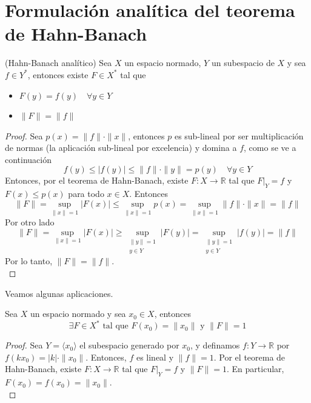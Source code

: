 \section{Formulación analítica del teorema de Hahn-Banach}

\begin{teo}(Hahn-Banach analítico)
    Sea $X$ un espacio normado, $Y$ un subespacio de $X$ y sea $f\in Y^*$, entonces existe $F \in X^*$ tal que \begin{itemize}
        \item [i)] $F(y) = f(y) \quad \forall y \in Y$
        \item [ii)] $\|F\| = \|f\|$
    \end{itemize}
\begin{proof}
    Sea $p(x) = \|f\| \cdot \|x\|$, entonces $p$ es sub-lineal por ser multiplicación de normas (la aplicación sub-lineal por excelencia) y domina a $f$, como se ve a continuación
    \begin{equation*}
        f(y) \leq |f(y)| \leq \|f\| \cdot \|y\| = p(y) \quad \forall y \in Y
    \end{equation*}
    Entonces, por el teorema de Hahn-Banach, existe $F: X \to \mathbb{R}$ tal que $F|_Y = f$ y $F(x) \leq p(x)$ para todo $x \in X$. Entonces 
    $$\|F\| = \sup_{\|x\|=1} |F(x)| \leq \sup_{\|x\|=1} p(x) = \sup_{\|x\|=1} \|f\|\cdot\|x\| = \|f\|$$
    Por otro lado
    $$\|F\| = \sup_{\|x\|=1} |F(x)| \geq \sup_{\substack{\|y\|=1 \\ y \in Y}} |F(y)| = \sup_{\substack{\|y\|=1 \\ y \in Y}} |f(y)| = \|f\|$$
    Por lo tanto, $\|F\| = \|f\|$. \\
\end{proof}
\end{teo}

\noindent 
Veamos algunas aplicaciones. \\

\begin{coro}\label{coro:hahn-banach-analitico}
    Sea $X$ un espacio normado y sea $x_0 \in X$, entonces
    \begin{equation*}
        \exists F \in X^* \text{ tal que } F(x_0) = \|x_0\| \text{ y } \|F\| = 1
    \end{equation*}

\begin{proof}
    Sea $Y = \langle x_0 \rangle$ el subespacio generado por $x_0$, y definamos $f: Y \to \mathbb{R}$ por $f(k x_0) = |k| \cdot \|x_0\|$. Entonces, $f$ es lineal y $\|f\| = 1$. Por el teorema de Hahn-Banach, existe $F: X \to \mathbb{R}$ tal que $F|_Y = f$ y $\|F\| = 1$. En particular, $F(x_0) = f(x_0) = \|x_0\|$. \\
\end{proof}
\end{coro}

